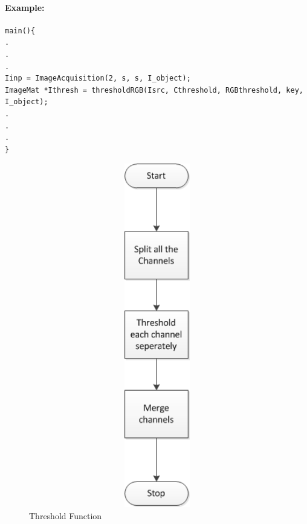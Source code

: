 \paragraph{Example:}
\begin{lstlisting}
main(){ 
.
.
.
Iinp = ImageAcquisition(2, s, s, I_object);
ImageMat *Ithresh = thresholdRGB(Isrc, Cthreshold, RGBthreshold, key, I_object);
.
.
.
}
\end{lstlisting}
\begin{figure} [ht] 
    \centering
    \begin{minipage}[b]{0.45\linewidth}
    \centering
    \includegraphics[width=15cm,height=15cm,keepaspectratio]{Pictures/thresholdRGB}
    \caption{Threshold Function}
    \label{fig:threshRGB}
    \end{minipage}
    \begin{minipage}[b]{0.45\linewidth}
    \centering

\end{minipage}
\end{figure}
